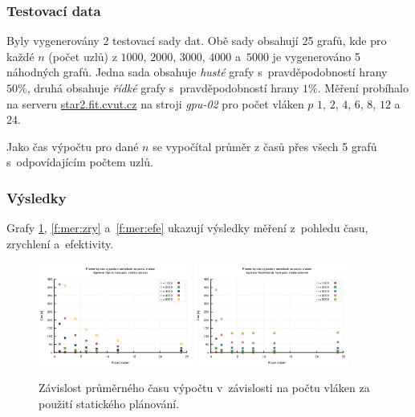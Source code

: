 \subsubsection{Testovací data} \label{l:testdata}
Byly vygenerovány 2 testovací sady dat. Obě sady obsahují 25 grafů, kde pro každé $n$ (počet uzlů) z $1000$, $2000$, $3000$, $4000$ a~$5000$ 
je vygenerováno 5 náhodných grafů. Jedna sada obsahuje \emph{husté} grafy s~pravděpodobností hrany $50 \%$, druhá obsahuje \emph{řídké} grafy
s~pravděpodobností hrany $1 \%$.
Měření probíhalo na serveru \url{star2.fit.cvut.cz} na stroji \textit{gpu-02} pro počet vláken $p$ $1$, $2$, $4$, $6$, $8$, $12$ a~$24$.

Jako čas výpočtu pro dané $n$ se vypočítal průměr z časů přes všech 5 grafů s~odpovídajícím počtem uzlů.

\subsubsection{Výsledky}
\label{l:vysledky}
Grafy \ref{f:mer:cas}, \ref{f:mer:zry} a~\ref{f:mer:efe} ukazují výsledky měření z~pohledu času, zrychlení a~efektivity.

\begin{figure}
    \centering
    \includegraphics[width=0.45\textwidth]{../grafy/02_openMP/02-01-Dijkstra_cas_v1}
    \includegraphics[width=0.45\textwidth]{../grafy/02_openMP/02-01-Floyd_cas_v1}
    \caption{Závislost průměrného času výpočtu v~závislosti na počtu vláken za použití statického plánování.}
    \label{f:mer:cas}
\end{figure}

